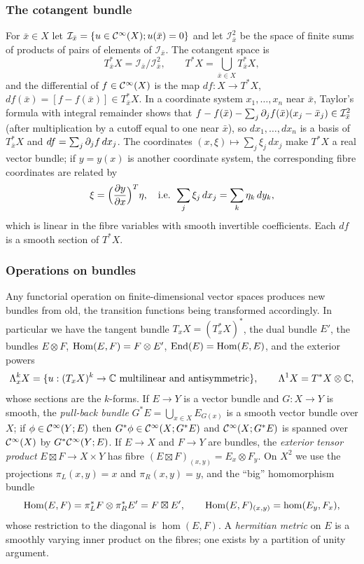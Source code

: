 \subsubsection*{The cotangent bundle}
For $\bar x\in X$ let $\mathcal I_{\bar x}=\{u\in\mathcal{C}^\infty(X);u(\bar x)=0\}$ and
let $\mathcal I_{\bar x}^2$ be the space of finite sums of products of pairs
of elements of $\mathcal I_{\bar x}$. The cotangent space is
\begin{equation*}
T^*_{\bar x}X=\mathcal I_{\bar x}/\mathcal I^2_{\bar x},\qquad T^*X=\bigcup_{\bar x\in X}T^*_{\bar x}X,
\end{equation*}
and the differential of $f\in\mathcal{C}^\infty(X)$ is the map $df:X\to T^*X$,
$df(\bar x)=[f-f(\bar x)]\in T^*_{\bar x}X$. In a coordinate system $x_1,\dots,x_n$
near $\bar x$, Taylor's formula with integral remainder shows that
$f-f(\bar x)-\sum_j\partial_jf(\bar x)(x_j-\bar x_j)\in\mathcal I^2_{\bar x}$ (after
multiplication by a cutoff equal to one near $\bar x$), so $dx_1,\dots,dx_n$ is a
basis of $T^*_{\bar x}X$ and $df=\sum_j\partial_jf\,dx_j$. The coordinates
$(x,\xi)\mapsto\sum_j\xi_j\,dx_j$ make $T^*X$ a real vector bundle; if $y=y(x)$
is another coordinate system, the corresponding fibre coordinates are related by
\begin{equation}\label{manifolds:eq:cotangent-change}
\xi=\Big(\frac{\partial y}{\partial x}\Big)^{T}\eta,\quad\text{i.e. }
\sum_j\xi_j\,dx_j=\sum_k\eta_k\,dy_k ,
\end{equation}
which is linear in the fibre variables with smooth invertible coefficients.
Each $df$ is a smooth section of $T^*X$.

\subsubsection*{Operations on bundles}
Any functorial operation on finite-dimensional vector spaces produces new
bundles from old, the transition functions being transformed accordingly. In
particular we have the tangent bundle $T_xX=(T^*_xX)^*$, the dual bundle $E'$,
the bundles $E\otimes F$, $\operatorname{Hom}(E,F)=F\otimes E'$, $\operatorname{End}(E)=\operatorname{Hom}(E,E)$, and the
exterior powers
\begin{equation*}
\Lambda^k_xX=\{u:(T_xX)^k\to\C\ \text{multilinear and antisymmetric}\},
\qquad \Lambda^1X=T^*X\otimes\C,
\end{equation*}
whose sections are the $k$-forms. If $E\to Y$ is a vector bundle and
$G:X\to Y$ is smooth, the \emph{pull-back bundle} $G^*E=\bigcup_{x\in X}E_{G(x)}$
is a smooth vector bundle over $X$; if $\phi\in\mathcal{C}^\infty(Y;E)$ then $G^*\phi\in\mathcal{C}^\infty(X;G^*E)$
and $\mathcal{C}^\infty(X;G^*E)$ is spanned over $\mathcal{C}^\infty(X)$ by $G^*\mathcal{C}^\infty(Y;E)$. If $E\to X$ and
$F\to Y$ are bundles, the \emph{exterior tensor product} $E\boxtimes F\to X\times Y$
has fibre $(E\boxtimes F)_{(x,y)}=E_x\otimes F_y$. On $X^2$ we use the projections
$\pi_L(x,y)=x$ and $\pi_R(x,y)=y$, and the ``big'' homomorphism bundle
\begin{equation}\label{manifolds:eq:big-hom}
\operatorname{Hom}(E,F)=\pi_L^*F\otimes\pi_R^*E'=F\boxtimes E',\qquad \operatorname{Hom}(E,F)_{(x,y)}=\hom(E_y,F_x),
\end{equation}
whose restriction to the diagonal is $\hom(E,F)$. A \emph{hermitian metric} on
$E$ is a smoothly varying inner product on the fibres; one exists by a partition
of unity argument.

